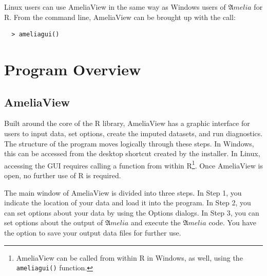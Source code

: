 \documentclass[12pt,titlepage]{article}
\newcommand{\Amelia}{\ensuremath{\mathfrak Amelia} }
\begin{document}
Linux users can use AmeliaView in the same way as Windows users of
\Amelia for R.  From the command line, AmeliaView can be brought up
with the call:
  \begin{verbatim}
  > ameliagui()
  \end{verbatim}




\section{Program Overview}
\label{sec:overview}

\subsection{AmeliaView}
\label{sec:guioverview}
Built around the core of the R library, AmeliaView has a graphic
interface for users to input data, set options, create the imputed
datasets, and run diagnostics.  The structure of the program moves
logically through these steps.  In Windows, this can be accessed from
the desktop shortcut created by the installer.  In Linux, accessing
the GUI requires calling a function from within R\footnote{AmeliaView
  can be called from within R in Windows, as well, using the
  \texttt{ameliagui()} function.}.  Once AmeliaView is open, no
further use of R is required.

The main window of AmeliaView is divided into three steps.  In Step 1,
you indicate the location of your data and load it into the program.
In Step 2, you can set options about your data by using the Options
dialogs.  In Step 3, you can set options about the output of
${\mathfrak Amelia}$ and execute the ${\mathfrak Amelia}$ code.  You
have the option to save your output data files for further use.
\end{document}
